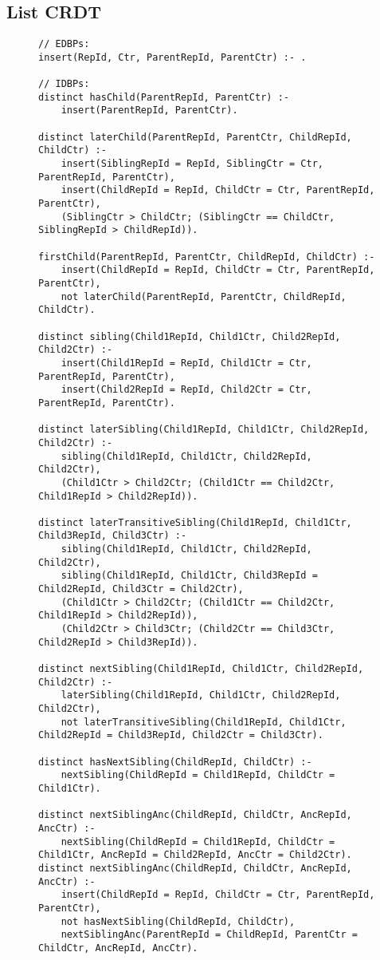 \subsection{List \ac{CRDT}}\label{sec:list-crdt-datalog-dialect}

\begin{figure}[htpb]
	\begin{lstlisting}[keepspaces]
// EDBPs:
insert(RepId, Ctr, ParentRepId, ParentCtr) :- .

// IDBPs:
distinct hasChild(ParentRepId, ParentCtr) :-
    insert(ParentRepId, ParentCtr).

distinct laterChild(ParentRepId, ParentCtr, ChildRepId, ChildCtr) :-
    insert(SiblingRepId = RepId, SiblingCtr = Ctr, ParentRepId, ParentCtr),
    insert(ChildRepId = RepId, ChildCtr = Ctr, ParentRepId, ParentCtr),
    (SiblingCtr > ChildCtr; (SiblingCtr == ChildCtr, SiblingRepId > ChildRepId)).

firstChild(ParentRepId, ParentCtr, ChildRepId, ChildCtr) :-
    insert(ChildRepId = RepId, ChildCtr = Ctr, ParentRepId, ParentCtr),
    not laterChild(ParentRepId, ParentCtr, ChildRepId, ChildCtr).

distinct sibling(Child1RepId, Child1Ctr, Child2RepId, Child2Ctr) :-
    insert(Child1RepId = RepId, Child1Ctr = Ctr, ParentRepId, ParentCtr),
    insert(Child2RepId = RepId, Child2Ctr = Ctr, ParentRepId, ParentCtr).

distinct laterSibling(Child1RepId, Child1Ctr, Child2RepId, Child2Ctr) :-
    sibling(Child1RepId, Child1Ctr, Child2RepId, Child2Ctr),
    (Child1Ctr > Child2Ctr; (Child1Ctr == Child2Ctr, Child1RepId > Child2RepId)).

distinct laterTransitiveSibling(Child1RepId, Child1Ctr, Child3RepId, Child3Ctr) :-
    sibling(Child1RepId, Child1Ctr, Child2RepId, Child2Ctr),
    sibling(Child1RepId, Child1Ctr, Child3RepId = Child2RepId, Child3Ctr = Child2Ctr),
    (Child1Ctr > Child2Ctr; (Child1Ctr == Child2Ctr, Child1RepId > Child2RepId)),
    (Child2Ctr > Child3Ctr; (Child2Ctr == Child3Ctr, Child2RepId > Child3RepId)).

distinct nextSibling(Child1RepId, Child1Ctr, Child2RepId, Child2Ctr) :-
    laterSibling(Child1RepId, Child1Ctr, Child2RepId, Child2Ctr),
    not laterTransitiveSibling(Child1RepId, Child1Ctr, Child2RepId = Child3RepId, Child2Ctr = Child3Ctr).

distinct hasNextSibling(ChildRepId, ChildCtr) :-
    nextSibling(ChildRepId = Child1RepId, ChildCtr = Child1Ctr).

distinct nextSiblingAnc(ChildRepId, ChildCtr, AncRepId, AncCtr) :-
    nextSibling(ChildRepId = Child1RepId, ChildCtr = Child1Ctr, AncRepId = Child2RepId, AncCtr = Child2Ctr).
distinct nextSiblingAnc(ChildRepId, ChildCtr, AncRepId, AncCtr) :-
    insert(ChildRepId = RepId, ChildCtr = Ctr, ParentRepId, ParentCtr),
    not hasNextSibling(ChildRepId, ChildCtr),
    nextSiblingAnc(ParentRepId = ChildRepId, ParentCtr = ChildCtr, AncRepId, AncCtr).


\end{lstlisting}
\end{figure}
